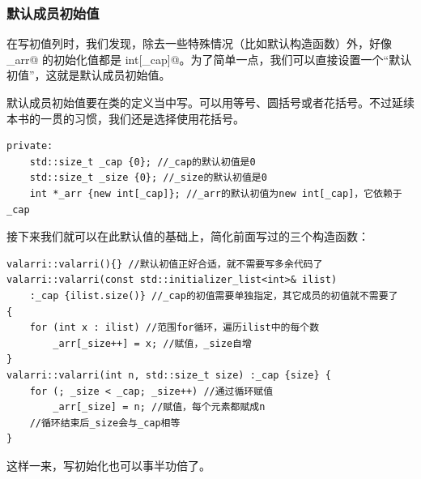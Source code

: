 \subsubsection*{默认成员初始值}
在写初值列时，我们发现，除去一些特殊情况（比如默认构造函数）外，好像 \lstinline@_arr@ 的初始化值都是 \lstinline@new int[_cap]@。为了简单一点，我们可以直接设置一个``默认初值''，这就是默认成员初始值。\par
默认成员初始值要在类的定义当中写。可以用等号、圆括号或者花括号。不过延续本书的一贯的习惯，我们还是选择使用花括号。
\begin{lstlisting}
private:
    std::size_t _cap {0}; //_cap的默认初值是0
    std::size_t _size {0}; //_size的默认初值是0
    int *_arr {new int[_cap]}; //_arr的默认初值为new int[_cap]，它依赖于_cap
\end{lstlisting}\par
接下来我们就可以在此默认值的基础上，简化前面写过的三个构造函数：
\begin{lstlisting}
valarri::valarri(){} //默认初值正好合适，就不需要写多余代码了
valarri::valarri(const std::initializer_list<int>& ilist)
    :_cap {ilist.size()} //_cap的初值需要单独指定，其它成员的初值就不需要了
{
    for (int x : ilist) //范围for循环，遍历ilist中的每个数
        _arr[_size++] = x; //赋值，_size自增
}
valarri::valarri(int n, std::size_t size) :_cap {size} {
    for (; _size < _cap; _size++) //通过循环赋值
        _arr[_size] = n; //赋值，每个元素都赋成n
    //循环结束后_size会与_cap相等
}
\end{lstlisting}
这样一来，写初始化也可以事半功倍了。\par
